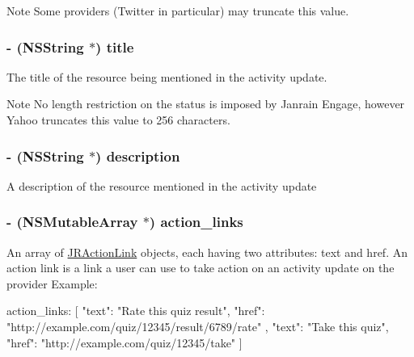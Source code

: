 \begin{DoxyNote}{Note}
Some providers (Twitter in particular) may truncate this value. 
\end{DoxyNote}
\hypertarget{interface_j_r_activity_object_ae64ba976e73c3926a04c46ba0aeba583}{
\subsubsection[{title}]{\setlength{\rightskip}{0pt plus 5cm}-\/ (NSString $\ast$) title}}
\label{interface_j_r_activity_object_ae64ba976e73c3926a04c46ba0aeba583}
The title of the resource being mentioned in the activity update.

\begin{DoxyNote}{Note}
No length restriction on the status is imposed by Janrain Engage, however Yahoo truncates this value to 256 characters. 
\end{DoxyNote}
\hypertarget{interface_j_r_activity_object_a35d4fcb4e1aaa9d6325333228104604f}{
\subsubsection[{description}]{\setlength{\rightskip}{0pt plus 5cm}-\/ (NSString $\ast$) description}}
\label{interface_j_r_activity_object_a35d4fcb4e1aaa9d6325333228104604f}
A description of the resource mentioned in the activity update \hypertarget{interface_j_r_activity_object_aa5c629e1c3b8306b2532ab647f7f6ec5}{
\subsubsection[{action\_\-links}]{\setlength{\rightskip}{0pt plus 5cm}-\/ (NSMutableArray $\ast$) action\_\-links}}
\label{interface_j_r_activity_object_aa5c629e1c3b8306b2532ab647f7f6ec5}
An array of {\ttfamily \hyperlink{interface_j_r_action_link}{JRActionLink}} objects, each having two attributes: text and href. An action link is a link a user can use to take action on an activity update on the provider Example: 
\begin{DoxyCode}
 action_links: 
 [
   {
     "text": "Rate this quiz result",
     "href": "http://example.com/quiz/12345/result/6789/rate"
   },
   {
     "text": "Take this quiz",
     "href": "http://example.com/quiz/12345/take"
   }
 ]
\end{DoxyCode}


